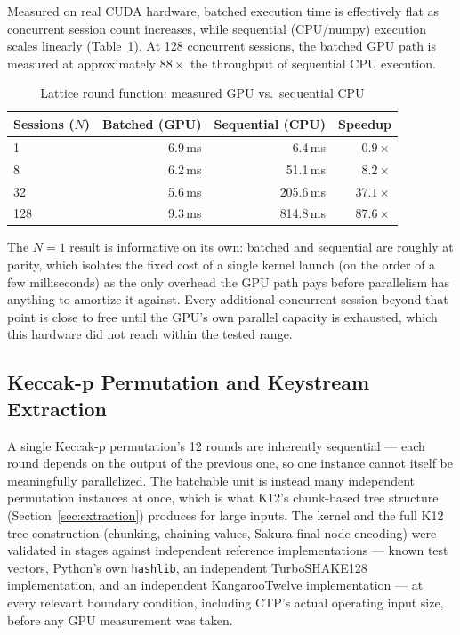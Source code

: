 \documentclass[twocolumn,10pt,journal,compsoc]{IEEEtran}
\begin{document}
Measured on real CUDA hardware, batched execution time is effectively flat as concurrent session count increases, while sequential (CPU/numpy) execution scales linearly (Table~\ref{tab:lattice-gpu}). At 128 concurrent sessions, the batched GPU path is measured at approximately $88\times$ the throughput of sequential CPU execution.

\begin{table}[h]
\centering
\caption{Lattice round function: measured GPU vs.\ sequential CPU}
\label{tab:lattice-gpu}
\begin{tabular}{@{}lrrr@{}}
\toprule
Sessions ($N$) & Batched (GPU) & Sequential (CPU) & Speedup \\
\midrule
1   & 6.9\,ms  & 6.4\,ms   & $0.9\times$ \\
8   & 6.2\,ms  & 51.1\,ms  & $8.2\times$ \\
32  & 5.6\,ms  & 205.6\,ms & $37.1\times$ \\
128 & 9.3\,ms  & 814.8\,ms & $87.6\times$ \\
\bottomrule
\end{tabular}
\end{table}

The $N=1$ result is informative on its own: batched and sequential are roughly at parity, which isolates the fixed cost of a single kernel launch (on the order of a few milliseconds) as the only overhead the GPU path pays before parallelism has anything to amortize it against. Every additional concurrent session beyond that point is close to free until the GPU's own parallel capacity is exhausted, which this hardware did not reach within the tested range.

\subsection{Keccak-p Permutation and Keystream Extraction}
\label{sec:k12-gpu}
A single Keccak-p permutation's 12 rounds are inherently sequential --- each round depends on the output of the previous one, so one instance cannot itself be meaningfully parallelized. The batchable unit is instead many independent permutation instances at once, which is what K12's chunk-based tree structure (Section~\ref{sec:extraction}) produces for large inputs. The kernel and the full K12 tree construction (chunking, chaining values, Sakura final-node encoding) were validated in stages against independent reference implementations --- known test vectors, Python's own \texttt{hashlib}, an independent TurboSHAKE128 implementation, and an independent KangarooTwelve implementation --- at every relevant boundary condition, including CTP's actual operating input size, before any GPU measurement was taken.
\end{document}
